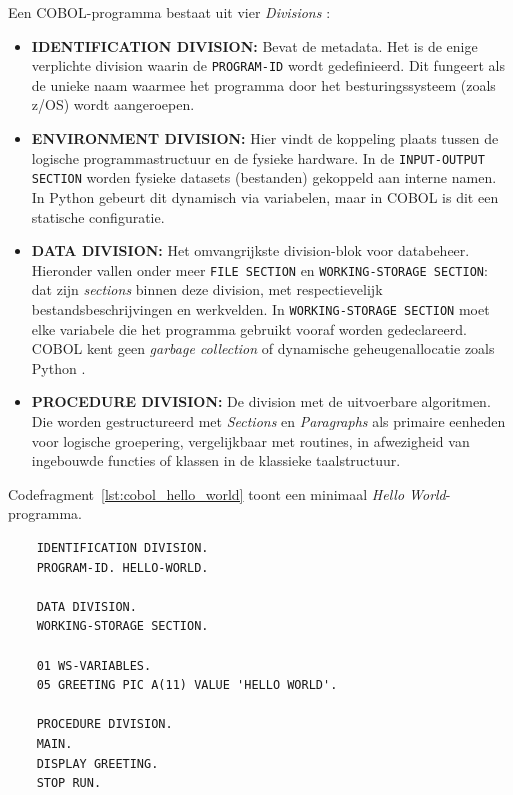 Een COBOL-programma bestaat uit vier \textit{Divisions} \autocite{IBM2023}:

\begin{itemize}
    \item \textbf{IDENTIFICATION DIVISION:} Bevat de metadata. Het is de enige verplichte division waarin de \texttt{PROGRAM-ID} wordt gedefinieerd.
    Dit fungeert als de unieke naam waarmee het programma door het besturingssysteem (zoals z/OS) wordt aangeroepen.
    \item \textbf{ENVIRONMENT DIVISION:} Hier vindt de koppeling plaats tussen de logische programmastructuur en de fysieke hardware. In de \texttt{INPUT-OUTPUT SECTION} worden fysieke datasets (bestanden) gekoppeld aan interne namen. In Python gebeurt dit dynamisch via variabelen, maar in COBOL is dit een statische configuratie.
    \item \textbf{DATA DIVISION:} Het omvangrijkste division-blok voor databeheer. Hieronder vallen onder meer \texttt{FILE SECTION} en \texttt{WORKING-STORAGE SECTION}: dat zijn \emph{sections} binnen deze division, met respectievelijk bestandsbeschrijvingen en werkvelden. In \texttt{WORKING-STORAGE SECTION} moet elke variabele die het programma gebruikt vooraf worden gedeclareerd. COBOL kent geen \textit{garbage collection} of dynamische geheugenallocatie zoals Python \autocite{Ebbers2011}.
    \item \textbf{PROCEDURE DIVISION:} De division met de uitvoerbare algoritmen. Die worden gestructureerd met \textit{Sections} en \textit{Paragraphs} als primaire eenheden voor logische groepering, vergelijkbaar met routines, in afwezigheid van ingebouwde functies of klassen in de klassieke taalstructuur.
\end{itemize}

Codefragment~\ref{lst:cobol_hello_world} toont een minimaal \emph{Hello World}-programma.

\begin{listing}[H]
  \begin{verbatim}
    IDENTIFICATION DIVISION.
    PROGRAM-ID. HELLO-WORLD.

    DATA DIVISION.
    WORKING-STORAGE SECTION.

    01 WS-VARIABLES.
    05 GREETING PIC A(11) VALUE 'HELLO WORLD'.

    PROCEDURE DIVISION.
    MAIN.
    DISPLAY GREETING.
    STOP RUN.
  \end{verbatim}
  \caption[Hello World in COBOL]{Hello World in COBOL.}
  \label{lst:cobol_hello_world}
\end{listing}

